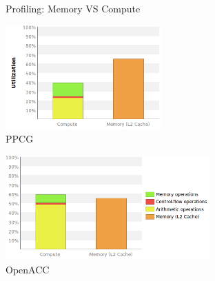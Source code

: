 \documentclass[aspectratio=169]{beamer}
\begin{document}
\begin{frame}[fragile]{Profiling: Memory VS Compute}

\begin{minipage}{7cm}
\centering
\includegraphics[height=4cm]{figures/ppcg_compute}\\
{\footnotesize PPCG}
\end{minipage}%
\begin{minipage}{7cm}
\centering
\includegraphics[height=4cm]{figures/openacc_compute}\\
{\footnotesize OpenACC}
\end{minipage}

\end{frame}
\end{document}
